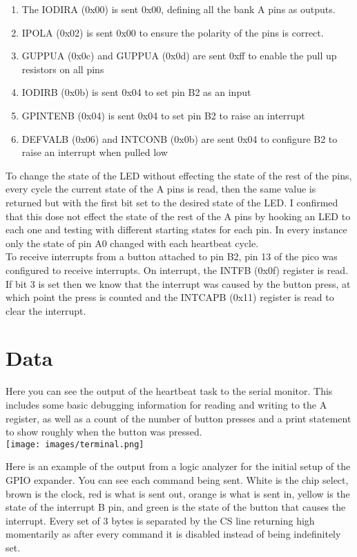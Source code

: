 \documentclass[sigconf]{article}
\begin{document}
\begin{enumerate}
    \item The IODIRA (0x00) is sent 0x00, defining all the bank A pins as outputs. 
    \item IPOLA (0x02) is sent 0x00 to ensure the polarity of the pins is correct.
    \item GUPPUA (0x0c) and GUPPUA (0x0d) are sent 0xff to enable the pull up resistors on all pins
    \item IODIRB (0x0b) is sent 0x04 to set pin B2 as an input
    \item GPINTENB (0x04) is sent 0x04 to set pin B2 to raise an interrupt
    \item DEFVALB (0x06) and INTCONB (0x0b) are sent 0x04 to configure B2 to raise an interrupt when pulled low
\end{enumerate}


To change the state of the LED without effecting the state of the rest of the pins, every cycle the current state of the A pins is read, then the same value is returned but with the first bit set to the desired state of the LED. I confirmed that this dose not effect the state of the rest of the A pins by hooking an LED to each one and testing with different starting states for each pin. In every instance only the state of pin A0 changed with each heartbeat cycle. \\

To receive interrupts from a button attached to pin B2, pin 13 of the pico was configured to receive interrupts. On interrupt, the INTFB (0x0f) register is read. If bit 3 is set then we know that the interrupt was caused by the button press, at which point the press is counted and the INTCAPB (0x11) register is read to clear the interrupt.

\section*{Data}

Here you can see the output of the heartbeat task to the serial monitor. This includes some basic debugging information for reading and writing to the A register, as well as a count of the number of button presses and a print statement to show roughly when the button was pressed. \\

\texttt{[image: images/terminal.png]}

Here is an example of the output from a logic analyzer for the initial setup of the GPIO expander. You can see each command being sent. White is the chip select, brown is the clock, red is what is sent out, orange is what is sent in, yellow is the state of the interrupt B pin, and green is the state of the button that causes the interrupt. Every set of 3 bytes is separated by the CS line returning high momentarily as after every command it is disabled instead of being indefinitely set. \\
\end{document}
